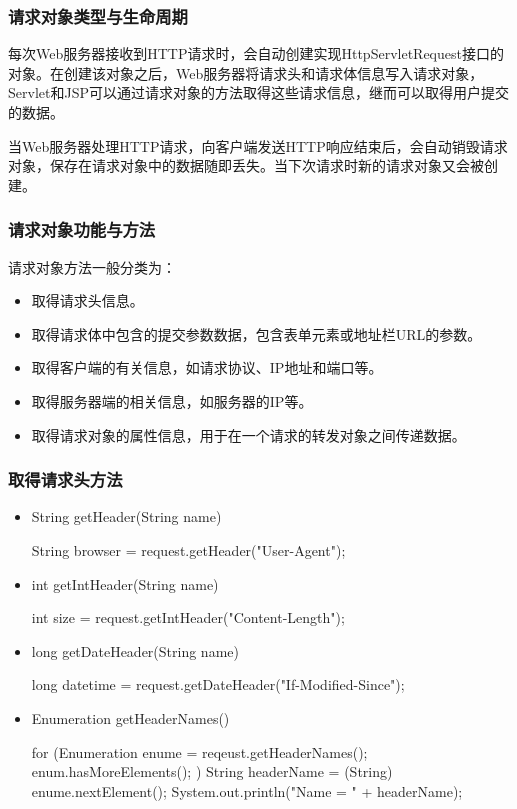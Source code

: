 \begin{frame}
\frametitle{请求对象类型与生命周期} 

每次Web服务器接收到HTTP请求时，会自动创建实现HttpServletRequest接口的对象。在创建该对象之后，Web服务器将请求头和请求体信息写入请求对象，Servlet和JSP可以通过请求对象的方法取得这些请求信息，继而可以取得用户提交的数据。


当Web服务器处理HTTP请求，向客户端发送HTTP响应结束后，会自动销毁请求对象，保存在请求对象中的数据随即丢失。当下次请求时新的请求对象又会被创建。
\end{frame}

\begin{frame}[fragile] %
\frametitle{请求对象功能与方法} 

请求对象方法一般分类为：
\begin{itemize}
\item 取得请求头信息。
\item 取得请求体中包含的提交参数数据，包含表单元素或地址栏URL的参数。
\item 取得客户端的有关信息，如请求协议、IP地址和端口等。
\item 取得服务器端的相关信息，如服务器的IP等。
\item 取得请求对象的属性信息，用于在一个请求的转发对象之间传递数据。
\end{itemize}
\end{frame}

\begin{frame}[fragile] %
\frametitle{取得请求头方法} 

\begin{itemize}
\item String getHeader(String name)
\begin{javaCode}
String browser = request.getHeader("User-Agent");
\end{javaCode}

\item int getIntHeader(String name)
\begin{javaCode}
int size = request.getIntHeader("Content-Length");
\end{javaCode}

\item long getDateHeader(String name)
\begin{javaCode}
long datetime = request.getDateHeader("If-Modified-Since");
\end{javaCode}

\item Enumeration getHeaderNames()
\begin{javaCode}
for (Enumeration enume = reqeust.getHeaderNames(); enum.hasMoreElements(); ) {
  String headerName = (String) enume.nextElement();
  System.out.println("Name = " + headerName);
}
\end{javaCode}
\end{itemize}
\end{frame}

